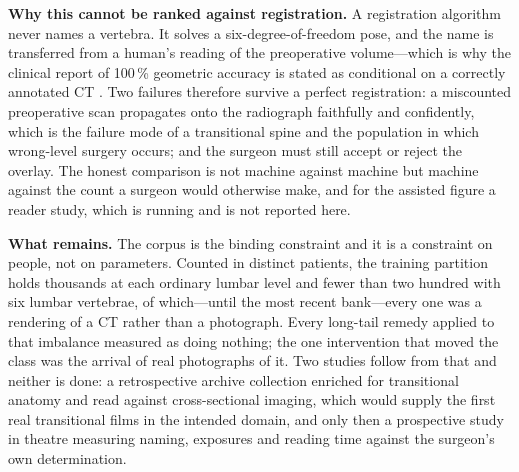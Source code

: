 \documentclass[11pt,letterpaper]{article}
\begin{document}
\noindent\textbf{Why this cannot be ranked against registration.} A registration algorithm never names a
vertebra. It solves a six-degree-of-freedom pose, and the name is transferred from a human's reading of the
preoperative volume---which is why the clinical report of 100\,\% geometric accuracy is stated as conditional
on a correctly annotated CT \citep{levelcheck2012,otake2015}. Two failures therefore survive a perfect
registration: a miscounted preoperative scan propagates onto the radiograph faithfully and confidently, which
is the failure mode of a transitional spine and the population in which wrong-level surgery occurs; and the
surgeon must still accept or reject the overlay. The honest comparison is not machine against machine but
machine against the count a surgeon would otherwise make, and for the assisted figure a reader study, which
is running and is not reported here.

\noindent\textbf{What remains.} The corpus is the binding constraint and it is a constraint on people, not
on parameters. Counted in distinct patients, the training partition holds thousands at each ordinary lumbar
level and fewer than two hundred with six lumbar vertebrae, of which---until the most recent bank---every
one was a rendering of a CT rather than a photograph. Every long-tail remedy applied to that imbalance
measured as doing nothing; the one intervention that moved the class was the arrival of real
photographs of it. Two studies follow from that and neither is done: a retrospective archive collection
enriched for transitional anatomy and read against cross-sectional imaging, which would supply the first
real transitional films in the intended domain, and only then a prospective study in theatre measuring
naming, exposures and reading time against the surgeon's own determination.
\end{document}
